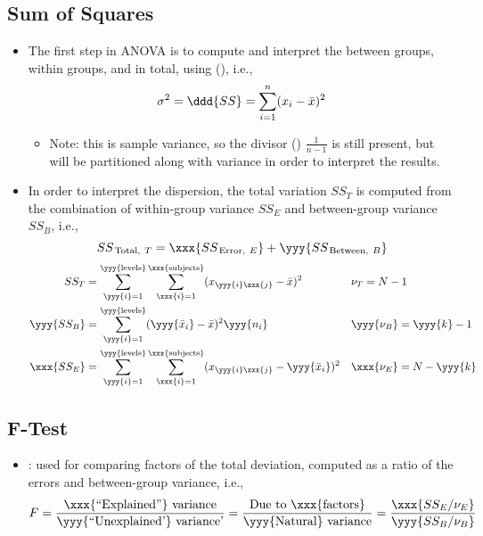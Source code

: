 \begin{itemize}
  \subsection{Sum of Squares}
  \begin{itemize}
    \item The first step in ANOVA is to compute and interpret the \hyperref[Subsection: Measures of Dispersion]{} between groups, within groups, and in total, using \hyperref[Subsection: Measures of Dispersion]{} (), i.e.,
    \[%
    \sigma^2 = \ddd{SS} = \sum_{i = 1}^{n}(x_i-\bar{x})^2
    \]%
    \begin{itemize}
      \item Note: this is sample variance, so the divisor (\hyperref[Subsection: Degrees of Freedom]{}) \(\frac{1}{n-1}\) is still present, but will be partitioned along with variance in order to interpret the results.
    \end{itemize}
    \item In order to interpret the dispersion, the total variation \(SS_T\) is computed from the combination of within-group variance \(SS_E\) and between-group variance \(SS_B\), i.e.,
    \[%
    SS_{\,\text{Total,}~T} = \xxx{SS_{\,\text{Error,}~E}} + \yyy{SS_{\,\text{Between,}~B}}
    \]%
    \begin{align*}
      SS_T &= \sum_{\yyy{i} = 1}^{\text{\yyy{\scriptsize{levels}}}}\sum_{\xxx{i} = 1}^{\text{\xxx{\scriptsize{subjects}}}}(x_{\yyy{i}\xxx{j}}-\bar{x})^2  &&
      \nu_T = N - 1\\
      \yyy{SS_B} &= \sum_{\yyy{i} = 1}^{\text{\yyy{\scriptsize{levels}}}}(\yyy{\bar{x}_i} - \bar{x})^2 \yyy{n_i} &&
      \yyy{\nu_B} = \yyy{k} - 1 \\
      \xxx{SS_E} &= \sum_{\yyy{i} = 1}^{\text{\yyy{\scriptsize{levels}}}}\sum_{\xxx{i} = 1}^{\text{\xxx{\scriptsize{subjects}}}}(x_{\yyy{i}\xxx{j}}-\yyy{\bar{x}_i})^2  &&
      \xxx{\nu_E} = N-\yyy{k} 
    \end{align*}
  \end{itemize}

  \subsection{F-Test}
  \begin{itemize}
    \item {}: used for comparing factors of the total deviation, computed as a ratio of the errors and between-group variance, i.e.,
    \[%
    F = \frac{\text{\xxx{``Explained''} variance}}{\text{\yyy{``Unexplained'} variance'}} = \frac{\text{Due to \xxx{factors}}}{\text{\yyy{Natural} variance}} = \frac{\xxx{SS_E / \nu_E}}{\yyy{SS_B/\nu_B}}
    \]%
    

\end{itemize}
\end{itemize}
